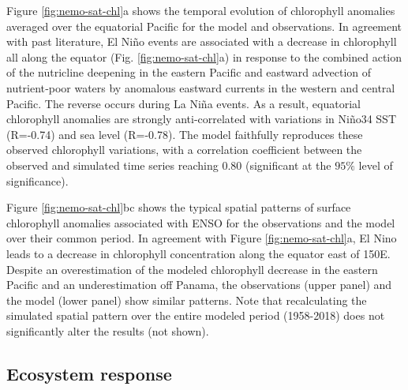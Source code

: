 Figure \ref{fig:nemo-sat-chl}a shows the temporal evolution of chlorophyll anomalies averaged over the equatorial Pacific for the model and observations. In agreement with past literature, El Niño events are associated with a decrease in chlorophyll all along the equator (Fig. \ref{fig:nemo-sat-chl}a) in response to the combined action of the nutricline deepening in the eastern Pacific and eastward advection of nutrient‐poor waters by anomalous eastward currents in the western and central Pacific. The reverse occurs during La Niña events. As a result, equatorial chlorophyll anomalies are strongly anti-correlated with variations in Niño34 SST (R=-0.74) and sea level (R=-0.78). The model faithfully reproduces these observed chlorophyll variations, with a correlation coefficient between the observed and simulated time series reaching $0.80$ (significant at the $95\%$ level of significance).

Figure \ref{fig:nemo-sat-chl}bc shows the typical spatial patterns of surface chlorophyll anomalies associated with ENSO for the observations and the model over their common period. In agreement with Figure \ref{fig:nemo-sat-chl}a, El Nino leads to a decrease in chlorophyll concentration along the equator east of 150\degree{}E. Despite an overestimation of the modeled chlorophyll decrease in the eastern Pacific and an underestimation off Panama, the observations (upper panel) and the model (lower panel) show similar patterns. Note that recalculating the simulated spatial pattern over the entire modeled period (1958-2018) does not significantly alter the results (not shown). 

\subsection{Ecosystem response}

